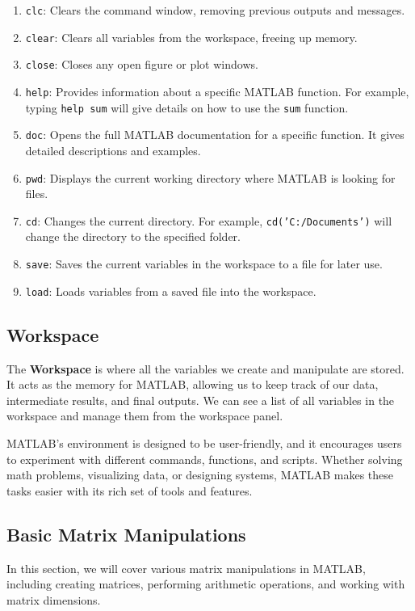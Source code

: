 \documentclass[a4paper,12pt]{article}
\begin{document}
\begin{enumerate}
	\item \texttt{clc}: Clears the command window, removing previous outputs and messages.
	\item \texttt{clear}: Clears all variables from the workspace, freeing up memory.
	\item \texttt{close}: Closes any open figure or plot windows.
	\item \texttt{help}: Provides information about a specific MATLAB function. For example, typing \texttt{help sum} will give details on how to use the \texttt{sum} function.
	\item \texttt{doc}: Opens the full MATLAB documentation for a specific function. It gives detailed descriptions and examples.
	\item \texttt{pwd}: Displays the current working directory where MATLAB is looking for files.
	\item \texttt{cd}: Changes the current directory. For example, \texttt{cd('C:/Documents')} will change the directory to the specified folder.
	\item \texttt{save}: Saves the current variables in the workspace to a file for later use.
	\item \texttt{load}: Loads variables from a saved file into the workspace.
\end{enumerate}

\subsection*{Workspace}
The \textbf{Workspace} is where all the variables we create and manipulate are stored. It acts as the memory for MATLAB, allowing us to keep track of our data, intermediate results, and final outputs. We can see a list of all variables in the workspace and manage them from the workspace panel.

MATLAB's environment is designed to be user-friendly, and it encourages users to experiment with different commands, functions, and scripts. Whether  solving math problems, visualizing data, or designing systems, MATLAB makes these tasks easier with its rich set of tools and features.


\subsection{Basic Matrix Manipulations}

In this section, we will cover various matrix manipulations in MATLAB, including creating matrices, performing arithmetic operations, and working with matrix dimensions.
\end{document}
